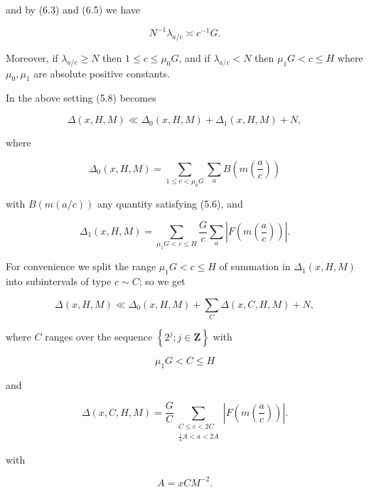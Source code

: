 \documentclass[10pt]{article}
\begin{document}
and by (6.3) and (6.5) we have


\begin{equation*}
N^{-1} \lambda_{a / c} \asymp c^{-1} G . \tag{6.7}
\end{equation*}


Moreover, if $\lambda_{a / c} \geqslant N$ then $1 \leqslant c \leqslant \mu_{0} G$, and if $\lambda_{a / c}<N$ then $\mu_{1} G<c \leqslant H$ where $\mu_{0}, \mu_{1}$ are absolute positive constants.

In the above setting (5.8) becomes


\begin{equation*}
\Delta(x, H, M) \ll \Delta_{0}(x, H, M)+\Delta_{1}(x, H, M)+N, \tag{6.8}
\end{equation*}


where

$$
\Delta_{0}(x, H, M)=\sum_{1 \leqslant c<\mu_{0} G} \sum_{a} B\left(m\left(\frac{a}{c}\right)\right)
$$

with $B(m(a/c))$ any quantity satisfying (5.6), and

$$
\Delta_{1}(x, H, M)=\sum_{\mu_{1} G<c \leqslant H} \frac{G}{c} \sum_{a}\left|F\left(m\left(\frac{a}{c}\right)\right)\right| .
$$

For convenience we split the range $\mu_{1}G<c\leqslant H$ of summation in $\Delta_{1}(x,H,M)$ into subintervals of type $c \sim C$; so we get


\begin{equation*}
\Delta(x, H, M) \ll \Delta_{0}(x, H, M)+\sum_{C} \Delta(x, C, H, M)+N, \tag{6.9}
\end{equation*}


where $C$ ranges over the sequence $\left\{2^{j} ; j \in \mathbf{Z}\right\}$ with


\begin{equation*}
\mu_{1} G<C \leqslant H \tag{6.10}
\end{equation*}


and


\begin{equation*}
\Delta(x,C,H,M)=\frac{G}{C}
\sum_{\substack{C\leqslant c<2C\\ \frac14 A<a<2A}}
\left|F\left(m\left(\frac ac\right)\right)\right|. \tag{6.11}
\end{equation*}


with


\begin{equation*}
A=x C M^{-2} . \tag{6.12}
\end{equation*}
\end{document}
